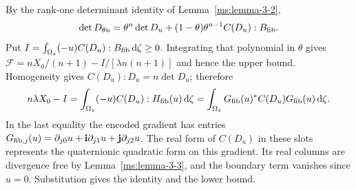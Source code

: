 By the rank-one determinant identity of Lemma~\ref{ms:lemma-3-2},
\[
 \det D_{\theta u}
 =\theta^n\det D_u+(1-\theta)\theta^{n-1}C(D_u):B_{\rm fib}.
\]
Put $I=\int_{\Omega_z}(-u)C(D_u):B_{\rm fib}\,\mathrm d\zeta\ge0$. Integrating that polynomial in $\theta$ gives $\mathcal F=nX_0/(n+1)-I/[\lambda n(n+1)]$ and hence the upper bound. Homogeneity gives $C(D_u):D_u=n\det D_u$; therefore
\[
 n\lambda X_0-I=\int_{\Omega_z}(-u)C(D_u):H_{\rm fib}(u)\,\mathrm d\zeta
 =\int_{\Omega_z}G_{\rm fib}(u)^*C(D_u)G_{\rm fib}(u)\,\mathrm d\zeta.
\]
In the last equality the encoded gradient has entries $G_{{\rm fib},j}(u)=\partial_{j0}u+\mathbf i\partial_{j1}u+\mathbf j\partial_{j2}u$. The real form of $C(D_u)$ in these slots represents the quaternionic quadratic form on this gradient. Its real columns are divergence free by Lemma~\ref{ms:lemma-3-3}, and the boundary term vanishes since $u=0$. Substitution gives the identity and the lower bound.
